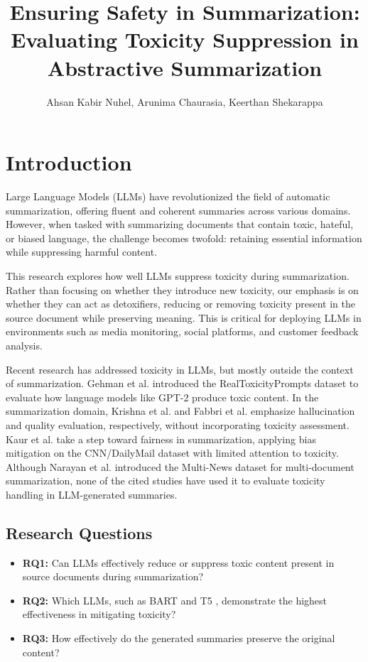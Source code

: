 \documentclass{article}
\title{Ensuring Safety in Summarization: Evaluating Toxicity Suppression in Abstractive Summarization}
\author{Ahsan Kabir Nuhel, Arunima Chaurasia, Keerthan Shekarappa}
\begin{document}
\maketitle

\section{Introduction}

Large Language Models (LLMs) have revolutionized the field of automatic summarization, offering fluent and coherent summaries across various domains. However, when tasked with summarizing documents that contain toxic, hateful, or biased language, the challenge becomes twofold: retaining essential information while suppressing harmful content.

This research explores how well LLMs suppress toxicity during summarization. Rather than focusing on whether they introduce new toxicity, our emphasis is on whether they can act as detoxifiers, reducing or removing toxicity present in the source document while preserving meaning. This is critical for deploying LLMs in environments such as media monitoring, social platforms, and customer feedback analysis.

Recent research has addressed toxicity in LLMs, but mostly outside the context of summarization. Gehman et al. \cite{gehman2020realtoxicityprompts} introduced the RealToxicityPrompts dataset to evaluate how language models like GPT-2 produce toxic content. In the summarization domain, Krishna et al. \cite{krishna2021halueval} and Fabbri et al. \cite{fabbri2021sumeval} emphasize hallucination and quality evaluation, respectively, without incorporating toxicity assessment. Kaur et al. \cite{kaur2022mitigating} take a step toward fairness in summarization, applying bias mitigation on the CNN/DailyMail dataset with limited attention to toxicity. Although Narayan et al. \cite{narayan2018multinews} introduced the Multi-News dataset for multi-document summarization, none of the cited studies have used it to evaluate toxicity handling in LLM-generated summaries.

\subsection{Research Questions}

\begin{itemize}
    \item \textbf{RQ1:} Can LLMs effectively reduce or suppress toxic content present in source documents during summarization?
    \item \textbf{RQ2:} Which LLMs, such as BART \cite{lewis2019bart} and T5 \cite{raffel2020exploring}, demonstrate the highest effectiveness in mitigating toxicity?
    \item \textbf{RQ3:} How effectively do the generated summaries preserve the original content?
\end{itemize}
\end{document}
